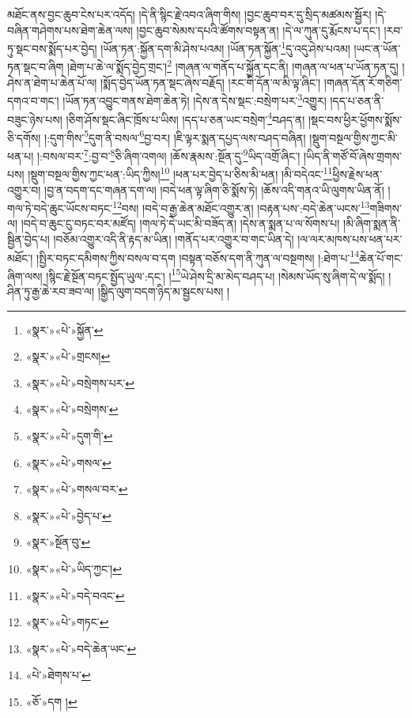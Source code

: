 མཐོང་ནས་བྱང་ཆུབ་ངེས་པར་འདོད། །དེ་ནི་སྙིང་རྗེ་འབའ་ཞིག་གིས། །བྱང་ཆུབ་བར་དུ་སྲིད་མཚམས་སྦྱོར། །དེ་བཞིན་གཤེགས་པས་ཐེག་ཆེན་ལས། །བྱང་ཆུབ་སེམས་དཔའི་ཚོགས་བསྟན་ན། །དེ་ལ་ཀུན་དུ་རྨོངས་པ་དང་། །རབ་ཏུ་སྡང་བས་སྨོད་པར་བྱེད། །ཡོན་ཏན་:སྐྱོན་དག་མི་ཤེས་པའམ། །ཡོན་ཏན་སྐྱོན་\footnote{«སྣར་»«པེ་»སྐྱོན་}དུ་འདུ་ཤེས་པའམ། །ཡང་ན་ཡོན་ཏན་སྡང་བ་ཞིག །ཐེག་པ་ཆེ་ལ་སྨོད་བྱེད་གྲང་།\footnote{«སྣར་»«པེ་»གྲངས།} །གཞན་ལ་གནོད་པ་སྐྱོན་དང་ནི། །གཞན་ལ་ཕན་པ་ཡོན་ཏན་དུ། །ཤེས་ན་ཐེག་པ་ཆེན་པོ་ལ། །སྨོད་བྱེད་ཡོན་ཏན་སྡང་ཞེས་བརྗོད། །རང་གི་དོན་ལ་མི་ལྟ་ཞིང་། །གཞན་དོན་རོ་གཅིག་དགའ་བ་གང་། །ཡོན་ཏན་འབྱུང་གནས་ཐེག་ཆེན་ཏེ། །དེས་ན་དེས་སྡང་:བསྲེག་པར་\footnote{«སྣར་»«པེ་»བསྲེགས་པར་}འགྱུར། །དད་པ་ཅན་ནི་བཟུང་ཉེས་པས། །ཅིག་ཤོས་སྡང་ཞིང་ཁྲོས་པ་ཡིས། །དད་པ་ཅན་ཡང་བསྲེག་\footnote{«སྣར་»«པེ་»བསྲེགས་}བཤད་ན། །སྡང་བས་ཕྱིར་ཕྱོགས་སྨོས་ཅི་དགོས། །:དུག་གིས་\footnote{«སྣར་»«པེ་»དུག་གི་}དུག་ནི་བསལ་\footnote{«སྣར་»«པེ་»གསལ་}བྱ་བར། །ཇི་ལྟར་སྨན་དཔྱད་ལས་བཤད་བཞིན། །སྡུག་བསྔལ་གྱིས་ཀྱང་མི་ཕན་པ། །:བསལ་བར་\footnote{«སྣར་»«པེ་»གསལ་བར་}:བྱ་བ་\footnote{«སྣར་»«པེ་»བྱེད་པ་}ཅི་ཞིག་འགལ། །ཆོས་རྣམས་:སྔོན་དུ་\footnote{«སྣར་»སྔོན་བུ་}ཡིད་འགྲོ་ཞིང་། །ཡིད་ནི་གཙོ་བོ་ཞེས་གྲགས་པས། །སྡུག་བསྔལ་གྱིས་ཀྱང་ཕན་:ཡིད་ཀྱིས།\footnote{«སྣར་»«པེ་»ཡིད་ཀྱང་།} །ཕན་པར་བྱེད་པ་ཅིས་མི་ཕན། །མི་བདེའང་\footnote{«སྣར་»«པེ་»བདེ་བའང་}ཕྱིས་རྗེས་ཕན་འགྱུར་བ། །བྱ་ན་བདག་དང་གཞན་དག་ལ། །བདེ་ཕན་ལྟ་ཞིག་ཅི་སྨོས་ཏེ། །ཆོས་འདི་གནའ་ཡི་ལུགས་ཡིན་ནོ། །གལ་ཏེ་བདེ་ཆུང་ཡོངས་བཏང་\footnote{«སྣར་»«པེ་»གཏང་}བས། །བདེ་བ་རྒྱ་ཆེན་མཐོང་འགྱུར་ན། །བརྟན་པས་:བདེ་ཆེན་ཡངས་\footnote{«སྣར་»«པེ་»བདེ་ཆེན་ཡང་}གཟིགས་ལ། །བདེ་བ་ཆུང་ངུ་བཏང་བར་མཛོད། །གལ་ཏེ་དེ་ཡང་མི་བཟོད་ན། །དེས་ན་སྨན་པ་ལ་སོགས་པ། །མི་ཞིག་སྨན་ནི་སྦྱིན་བྱེད་པ། །བཅོམ་འགྱུར་འདི་ནི་རྟད་མ་ཡིན། །གནོད་པར་འགྱུར་བ་གང་ཡིན་དེ། །ལ་ལར་མཁས་པས་ཕན་པར་མཐོང་། །སྤྱིར་བཏང་དམིགས་ཀྱིས་བསལ་བ་དག །བསྟན་བཅོས་དག་ནི་ཀུན་ལ་བསྔགས། །:ཐེག་པ་\footnote{«པེ་»ཐེགས་པ་}ཆེན་པོ་གང་ཞིག་ལས། །སྙིང་རྗེ་སྔོན་བཏང་སྤྱོད་ཡུལ་:དང་། །\footnote{«ཅོ་»དག །}ཡེ་ཤེས་དྲི་མ་མེད་བཤད་པ། །སེམས་ཡོད་སུ་ཞིག་དེ་ལ་སྨོད། །ཤིན་ཏུ་རྒྱ་ཆེ་རབ་ཟབ་ལ། །སྒྱིད་ལུག་བདག་ཉིད་མ་སྦྱངས་པས། །
